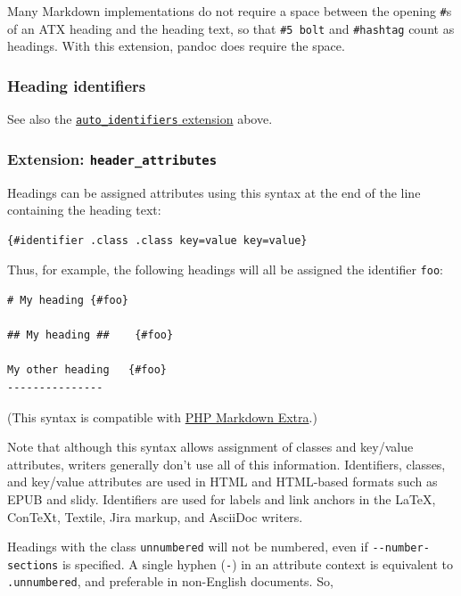 \documentclass[
]{article}
\begin{document}
Many Markdown implementations do not require a space between the opening
\texttt{\#}s of an ATX heading and the heading text, so that
\texttt{\#5\ bolt} and \texttt{\#hashtag} count as headings. With this
extension, pandoc does require the space.

\hypertarget{heading-identifiers}{%
\subsubsection{Heading identifiers}\label{heading-identifiers}}

See also the
\protect\hyperlink{extension-auto_identifiers}{\texttt{auto\_identifiers}
extension} above.

\hypertarget{extension-header_attributes}{%
\subsubsection{\texorpdfstring{Extension:
\texttt{header\_attributes}}{Extension: header\_attributes}}\label{extension-header_attributes}}

Headings can be assigned attributes using this syntax at the end of the
line containing the heading text:

\begin{verbatim}
{#identifier .class .class key=value key=value}
\end{verbatim}

Thus, for example, the following headings will all be assigned the
identifier \texttt{foo}:

\begin{verbatim}
# My heading {#foo}

## My heading ##    {#foo}

My other heading   {#foo}
---------------
\end{verbatim}

(This syntax is compatible with
\href{https://michelf.ca/projects/php-markdown/extra/}{PHP Markdown
Extra}.)

Note that although this syntax allows assignment of classes and
key/value attributes, writers generally don't use all of this
information. Identifiers, classes, and key/value attributes are used in
HTML and HTML-based formats such as EPUB and slidy. Identifiers are used
for labels and link anchors in the LaTeX, ConTeXt, Textile, Jira markup,
and AsciiDoc writers.

Headings with the class \texttt{unnumbered} will not be numbered, even
if \texttt{-\/-number-sections} is specified. A single hyphen
(\texttt{-}) in an attribute context is equivalent to
\texttt{.unnumbered}, and preferable in non-English documents. So,
\end{document}
